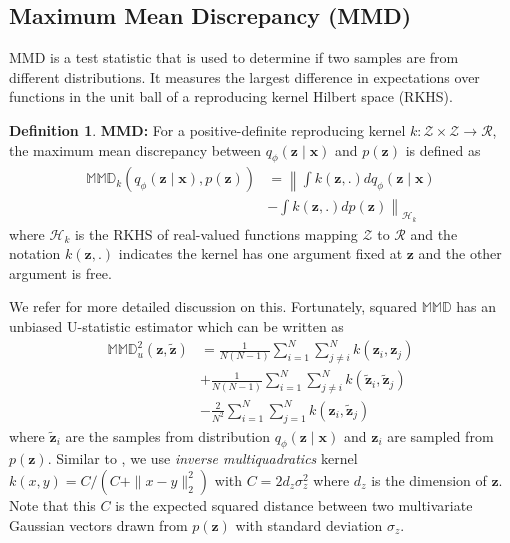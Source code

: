 \documentclass{article}
\def\bx{\mathbf{x}}
\def\bz{\mathbf{z}}
\theoremstyle{plain}
\theoremstyle{definition}
\newtheorem{defn}[thm]{Definition} %
\begin{document}
\subsection{Maximum Mean Discrepancy (MMD)}
\label{sec:mmd}
MMD \cite{gretton2012kernel} is a test statistic that is used to determine if two samples are from different distributions. It measures the largest difference in expectations over functions in the unit ball of a reproducing kernel Hilbert space (RKHS).
\begin{defn} \textbf{MMD:} \cite{tolstikhin2017wasserstein}
For a positive-definite reproducing kernel $k : \mathcal{Z} \times \mathcal{Z} \rightarrow \mathcal{R}$, the maximum mean discrepancy between $q_{\phi}(\bz \mid \bx)$ and $p(\bz)$ is defined as
\begin{equation}
\begin{split}
\mathbb{MMD}_k \left( q_{\phi}(\bz \mid \bx), p(\bz) \right) &= \left\| \int k(\bz,.) dq_{\phi}(\bz \mid \bx) \right. \\
& \left. - \int k(\bz, .) dp(\bz) \right\|_{\mathcal{H}_k}
\end{split}
\end{equation}
where $\mathcal{H}_k$ is the RKHS of real-valued functions mapping $\mathcal{Z}$ to $\mathcal{R}$ and the notation $k(\bz, .)$ indicates the kernel has one argument fixed at $\bz$ and the other argument is free.
\end{defn}
We refer \cite{tolstikhin2017wasserstein} for more detailed discussion on this. Fortunately, squared $\mathbb{MMD}$ has an unbiased U-statistic estimator which can be written as
\begin{equation}
\begin{split}
\mathbb{MMD}^2_u(\bz, \tilde{\bz}) &= \frac{1}{N(N-1)} \sum_{i=1}^N \sum_{j \neq i}^N k(\bz_i, \bz_j) \\
&+ \frac{1}{N(N-1)} \sum_{i=1}^N \sum_{j \neq i}^N k(\tilde{\bz}_i, \tilde{\bz}_j) \\
&- \frac{2}{N^2}  \sum_{i=1}^N   \sum_{j=1}^N  k(\bz_i, \tilde{\bz}_j)
\end{split}
\end{equation}
where $\tilde{\bz}_i$ are the samples from distribution $q_{\phi}(\bz \mid \bx)$ and $\bz_i$ are sampled from $p(\bz)$. Similar to \cite{tolstikhin2017wasserstein}, we use \textit{inverse multiquadratics} kernel $k(x, y) = C / (C + \|x - y \|^2_2)$ with $C = 2 d_z \sigma_z^2$ where $d_z$ is the dimension of $\bz$. Note that this $C$ is the expected squared distance between two multivariate Gaussian vectors drawn from $p(\bz)$ with standard deviation $\sigma_z$.
\end{document}
